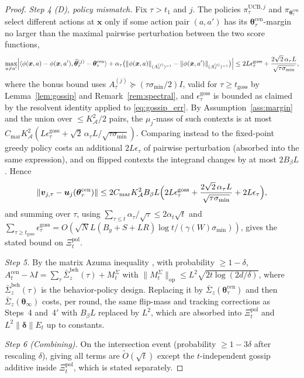 \documentclass[11pt]{article}
\newcommand{\Ot}{\widetilde{O}}
\begin{document}
\begin{proof}
\textit{Step 4 (D), policy mismatch.}
Fix $\tau>t_1$ and $j$.  The policies $\pi_\tau^{\mathrm{UCB},j}$ and
$\pi_{\bm\theta_\tau^{\mathrm{cen}}}$ select different actions at
$\bm{x}$ only if some action pair $(a,a')$ has its
$\bm\theta_\tau^{\mathrm{cen}}$-margin no larger than the maximal
pairwise perturbation between the two score functions,
\[
\max_{a\neq a'}\Bigl|
\langle\phi(\bm{x},a)-\phi(\bm{x},a'),
\widehat{\bm\theta}_\tau^{(j)}-\bm\theta_\tau^{\mathrm{cen}}\rangle
+\alpha_\tau\bigl(\|\phi(\bm{x},a)\|_{(A_\tau^{(j)})^{-1}}
-\|\phi(\bm{x},a')\|_{(A_\tau^{(j)})^{-1}}\bigr)\Bigr|
\leq 2L\epsilon_\tau^{\mathrm{goss}}
+\frac{2\sqrt2\,\alpha_\tau L}{\sqrt{\tau\sigma_{\min}}},
\]
where the bonus bound uses
$A_\tau^{(j)}\succeq(\tau\sigma_{\min}/2)I$, valid for
$\tau\geq t_{\mathrm{goss}}$ by Lemma~\ref{lem:gossip} and
Remark~\ref{rem:spectral}, and
$\epsilon_\tau^{\mathrm{goss}}$ is bounded as claimed by the resolvent
identity applied to \eqref{eq:gossip_err}.  By
Assumption~\ref{ass:margin} and the union over
$\leq K_{\mathcal{A}}^2/2$ pairs, the $\mu_j$-mass of such contexts is
at most
$C_{\mathrm{mar}}K_{\mathcal{A}}^2
(L\epsilon_\tau^{\mathrm{goss}}+\sqrt2\,\alpha_\tau L/\sqrt{\tau\sigma_{\min}})$.
Comparing instead to the fixed-point greedy policy costs an additional
$2L\epsilon_\tau$ of pairwise perturbation (absorbed into the same
expression), and on flipped contexts the integrand changes by at most
$2B_\beta L$.  Hence
\[
\|\bm{v}_{j,\tau}-\bm{u}_j(\bm{\theta}_\tau^{\mathrm{cen}})\|
\leq 2C_{\mathrm{mar}}K_{\mathcal{A}}^2 B_\beta L
\Bigl(2L\epsilon_\tau^{\mathrm{goss}}
+\frac{2\sqrt2\,\alpha_\tau L}{\sqrt{\tau\sigma_{\min}}}
+2L\epsilon_\tau\Bigr),
\]
and summing over $\tau$, using
$\sum_{\tau\leq t}\alpha_\tau/\sqrt\tau\leq 2\alpha_t\sqrt t$ and
$\sum_{\tau\geq t_{\mathrm{goss}}}\epsilon_\tau^{\mathrm{goss}}
=O(\sqrt N L(B_y+S+LR)\log t/(\gamma(W)\sigma_{\min}))$,
gives the stated bound on $\Xi_t^{\mathrm{pol}}$.

\textit{Step 5.}  By the matrix Azuma inequality
\citep[Thm.~7.1]{tropp2012}, with probability $\geq 1-\delta$,
$A_t^{\mathrm{cen}}-\lambda I
=\sum_\tau\bar{\Sigma}_z^{\mathrm{beh}}(\tau)+M_t^\Sigma$
with $\|M_t^\Sigma\|_{\mathrm{op}}\leq L^2\sqrt{2t\log(2d/\delta)}$,
where $\bar\Sigma_z^{\mathrm{beh}}(\tau)$ is the behavior-policy design. Replacing it by $\bar\Sigma_z(\bm\theta_\tau^{\mathrm{cen}})$ and then
$\bar\Sigma_z(\bm\theta_\infty)$ costs, per round, the same flip-mass
and tracking corrections as Steps~4 and~4$'$ with $B_\beta L$ replaced
by $L^2$, which are absorbed into $\Xi_t^{\mathrm{pol}}$ and
$L^2\|\bm\delta\|E_t$ up to constants.

\textit{Step 6 (Combining).}  On the intersection event
(probability $\geq 1-3\delta$ after rescaling $\delta$), giving
all terms are $\Ot(\sqrt t)$ except the $t$-independent gossip
additive inside $\Xi_t^{\mathrm{pol}}$, which is stated separately.
\end{proof}
\end{document}

